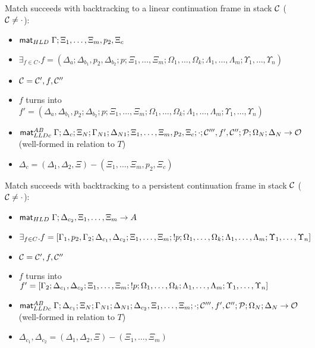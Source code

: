    \item Match succeeds with backtracking to a linear continuation frame in
   stack $\mathcal{C}$ ($\mathcal{C} \neq \cdot$):

   \begin{itemize}[leftmargin=\secondm]
      \item $\mathsf{mat}_{HLD} \; \Gamma; \Xi_1, \dotsc, \Xi_m, p_2, \Xi_c$
      \item $\exists_{f \in C}. f = (\Delta_a; \Delta_{b_1}, p_2,
            \Delta_{b_2}; p; \Xi_1, \dotsc, \Xi_m; \Omega_1, \dotsc,
            \Omega_k; \Lambda_1, \dotsc, \Lambda_m; \Upsilon_1, \dotsc,
            \Upsilon_n)$
      \item $\mathcal{C} = \mathcal{C'}, f, \mathcal{C''}$
      \item $f$ turns into $f' = (\Delta_a, \Delta_{b_1}, p_2;
            \Delta_{b_2}; p; \Xi_1, \dotsc, \Xi_m;
            \Omega_1, \dotsc, \Omega_k; \Lambda_1, \dotsc, \Lambda_m;
            \Upsilon_1, \dotsc, \Upsilon_n)$
      \item $\mathsf{mat}_{LLDc}^{AB} \; \Gamma; \Delta_c; \Xi_N; \Gamma_{N1}; \Delta_{N1}; \Xi_1,
         \dotsc, \Xi_m, p_2, \Xi_c; \cdot; \mathcal{C'''}, f', \mathcal{C''}; \mathcal{P};
         \Omega_N; \Delta_N \rightarrow \mathcal{O}$ (well-formed in relation to $T$)
      \item $\Delta_c = (\Delta_1, \Delta_2, \Xi) - (\Xi_1, \dotsc, \Xi_m, p_2, \Xi_c)$
   \end{itemize}

   \item Match succeeds with backtracking to a persistent continuation frame
   in stack $\mathcal{C}$ ($\mathcal{C} \neq \cdot$):
   \begin{itemize}[leftmargin=\secondm]
      \item $\mathsf{mat}_{HLD} \; \Gamma; \Delta_{c_2}, \Xi_1, \dotsc, \Xi_m \rightarrow A$
      \item $\exists_{f \in C}. f = [\Gamma_1, p_2, \Gamma_2; \Delta_{c_1},
         \Delta_{c_2}; \Xi_1, \dotsc, \Xi_m; {!} p; \Omega_1, \dotsc, \Omega_k;
         \Lambda_1, \dotsc, \Lambda_m; \Upsilon_1, \dotsc, \Upsilon_n]$
      \item $\mathcal{C} = \mathcal{C'}, f, \mathcal{C''}$
      \item $f$ turns into $f' = [\Gamma_2; \Delta_{c_1}, \Delta_{c_2};
         \Xi_1, \dotsc, \Xi_m; {!} p; \Omega_1, \dotsc, \Omega_k; \Lambda_1,
         \dotsc, \Lambda_m; \Upsilon_1, \dotsc, \Upsilon_n]$
      \item $\mathsf{mat}_{LLDc}^{AB} \; \Gamma; \Delta_{c_1}; \Xi_N; \Gamma_{N1}; \Delta_{N1};
         \Delta_{c_2}, \Xi_1, \dotsc, \Xi_m; \cdot; \mathcal{C'''}, f',
         \mathcal{C''}; \mathcal{P};
         \Omega_N; \Delta_N \rightarrow \mathcal{O}$ (well-formed in relation to $T$)
      \item $\Delta_{c_1}, \Delta_{c_2} = (\Delta_1, \Delta_2, \Xi) - (\Xi_1, \dotsc, \Xi_m)$
   \end{itemize}


